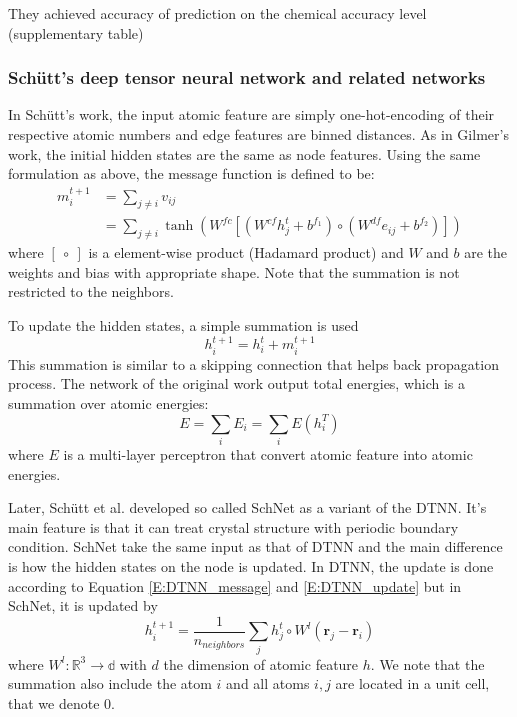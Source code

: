 \documentclass{article}
\begin{document}
They achieved accuracy of prediction on the chemical accuracy level (supplementary table)

\subsubsection{Sch\"{u}tt's deep tensor neural network and related networks}
In Sch\"{u}tt's work\cite{DTNN}, the input atomic feature are simply one-hot-encoding of their
respective atomic numbers and edge features are binned distances. 
As in Gilmer's work, the initial hidden states are the same as node features.
Using the same formulation as above, the message function is defined to be:
\begin{align}
    \label{E:DTNN_message}
    m_i^{t+1} &= \sum_{j\neq i} v_{ij} \\
            &= \sum_{j\neq i} \tanh \left( W^{fc}[ (W^{cf} h_j^t + b^{f_1}) \circ (W^{df} e_{ij} + b^{f_2}) ] \right)
\end{align}
where $[\ \circ\ ]$ is a element-wise product (Hadamard product) and $W$ and $b$ are the weights and bias with appropriate shape. 
Note that the summation is not restricted to the neighbors. 

To update the hidden states, a simple summation is used 
\begin{equation}
    \label{E:DTNN_update}
    h_i^{t+1} = h_i^t + m_i^{t+1}
\end{equation} 
This summation is similar to a skipping connection that helps back propagation process. 
The network of the original work output total energies, which is a summation over atomic energies:
\begin{equation}
    E = \sum_i E_i = \sum_i E(h_i^T)
\end{equation}
where $E$ is a multi-layer perceptron that convert atomic feature into atomic energies.

Later, Sch\"{u}tt et al.\cite{SchNet} developed so called SchNet as a variant of the DTNN. 
It's main feature is that it can treat crystal structure with periodic boundary condition.
SchNet take the same input as that of DTNN and the main difference is how the hidden states 
on the node is updated. In DTNN, the update is done according to Equation \eqref{E:DTNN_message}
and \eqref{E:DTNN_update} but in SchNet, it is updated by 
\begin{equation}
    \label{E:schnet_filter}
    h_i^{t+1} = \frac{1}{n_{neighbors}} \sum_j h^t_j \circ W^l(\mathbf{r}_j - \mathbf{r}_i)
\end{equation}
where $W^l\colon \mathbb{R}^3\to \mathbb{d}$ with $d$ the dimension of atomic feature $h$. We 
note that the summation also include the atom $i$ and all atoms $i,j$ are located in a 
unit cell, that we denote 0.
\end{document}

